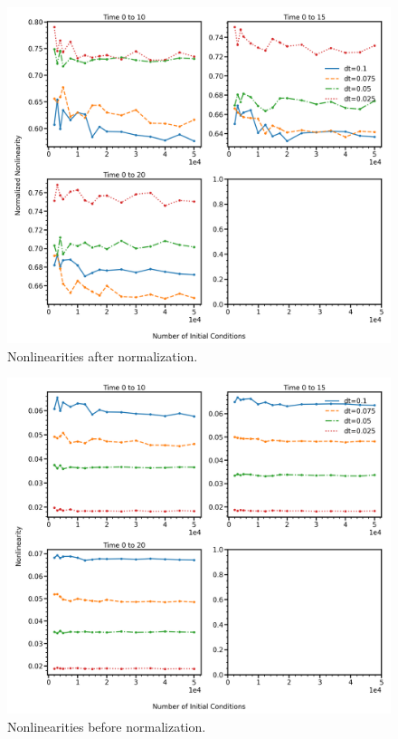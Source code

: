 \documentclass[11pt]{article} %
\numberwithin{equation}{section}  %
\begin{document}
\begin{figure}
	\centering
	
	\includegraphics[width=\linewidth]{figures/norm_nonlinearity}
	
	\caption{Nonlinearities after normalization.  }\label{norm_nonlniear}
\end{figure}


\begin{figure}
	\centering
	
	\includegraphics[width=\linewidth]{figures/nonnorm_nonlinearity}
	
	\caption{Nonlinearities before normalization.}\label{nonnorm_nonlinear}
\end{figure}
\end{document}
